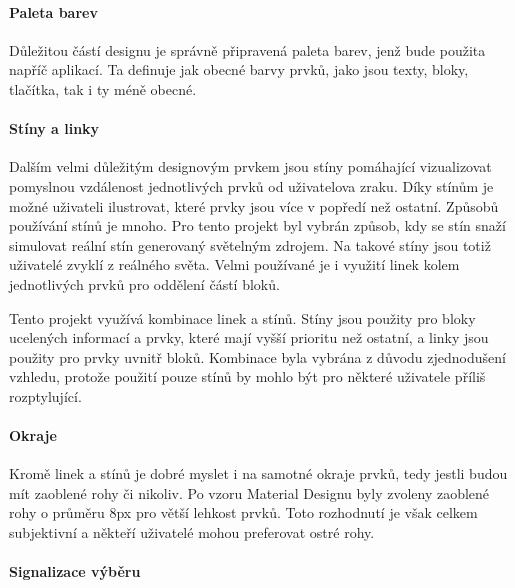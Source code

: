 		\paragraph{Paleta barev}

		Důležitou částí designu je správně připravená paleta barev, jenž bude použita napříč aplikací.
		Ta definuje jak obecné barvy prvků, jako jsou texty, bloky, tlačítka, tak i ty méně obecné.


		\paragraph{Stíny a linky}

		Dalším velmi důležitým designovým prvkem jsou stíny pomáhající vizualizovat pomyslnou vzdálenost jednotlivých
		prvků od uživatelova zraku.
		Díky stínům je možné uživateli ilustrovat, které prvky jsou více v
		popředí než ostatní.
		Způsobů používání stínů je mnoho.
		Pro tento projekt byl vybrán způsob, kdy se stín snaží simulovat reální stín generovaný světelným zdrojem.
		Na takové stíny jsou totiž uživatelé zvyklí z reálného světa.
		Velmi používané je i využití linek kolem jednotlivých prvků pro oddělení částí bloků.

		Tento projekt využívá kombinace linek a stínů.
		Stíny jsou použity pro bloky ucelených informací a prvky, které mají vyšší prioritu než
		ostatní, a linky jsou použity pro prvky uvnitř bloků.
		Kombinace byla vybrána z důvodu zjednodušení vzhledu, protože použití pouze stínů by mohlo být pro některé uživatele
		příliš rozptylující.


		\paragraph{Okraje}

		Kromě linek a stínů je dobré myslet i na samotné okraje prvků, tedy jestli budou mít zaoblené rohy či nikoliv.
		Po vzoru Material Designu byly zvoleny zaoblené rohy o průměru 8px pro větší lehkost prvků.
		Toto rozhodnutí je však celkem subjektivní a někteří uživatelé mohou preferovat ostré rohy.

		\paragraph{Signalizace výběru}

